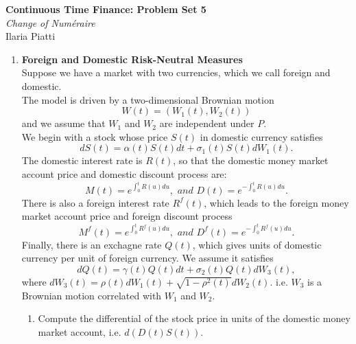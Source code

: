 \documentclass[11pt,a4,table]{article}
\begin{document}
\vspace*{-0.7in}

\begin{center}
 \textbf{Continuous Time Finance: Problem Set 5} \\
 \textit{Change of Num\'{e}raire}		\\
Ilaria Piatti
\end{center} 


\begin{enumerate}
    \item \textbf{Foreign and Domestic Risk-Neutral Measures}\\
    Suppose we have a market with two currencies, which we call foreign and domestic.\\
    The model is driven by a two-dimensional Brownian motion
    \begin{equation*}
        W(t) = (W_1(t), W_2(t))
    \end{equation*}
    and we assume that $W_1$ and $W_2$ are independent under $P$.\\
    We begin with a stock whose price $S(t)$ in domestic currency satisfies
    \begin{equation}
        dS(t) = \alpha(t) S(t) dt + \sigma_1(t) S(t) dW_1(t).
    \end{equation}
    The domestic interest rate is $R(t)$, so that the domestic money market account price and domestic discount process are:
    \begin{equation*}
        M(t) = e^{\int_0^t R(u) du}, \textit{ and } D(t) = e^{-\int_0^t R(u) du}.
    \end{equation*}
    There is also a foreign interest rate $R^f(t)$, which leads to the foreign money market account price and foreign discount process
    \begin{equation*}
        M^f(t)=e^{\int_0^t R^f(u) du}, \textit{ and } D^f(t) = e^{-\int_0^t R^f(u) du}.
    \end{equation*}
    Finally, there is an exchagne rate $Q(t)$, which gives units of domestic currency per unit of foreign currency. We assume it satisfies
    \begin{equation}
        dQ(t) = \gamma(t)Q(t) dt + \sigma_2(t) Q(t) dW_3(t),
    \end{equation}
    where $dW_3(t) = \rho(t) dW_1(t) + \sqrt{1-\rho^2(t)} dW_2(t)$. i.e. $W_3$ is a Brownian motion correlated with $W_1$ and $W_2$.
    
    \begin{enumerate}
        \item Compute the differential of the stock price in units of the domestic money market account, i.e. $d(D(t)S(t))$.
        

\end{enumerate}
\end{enumerate}
\end{document}
